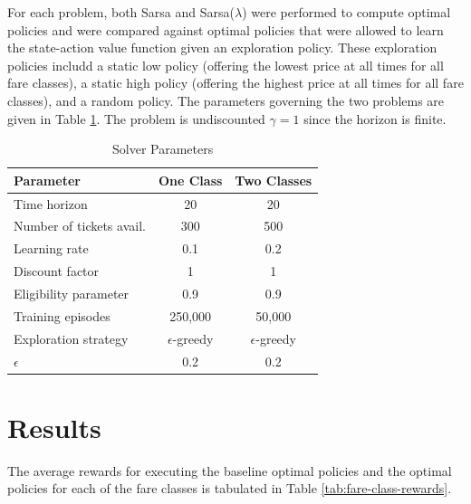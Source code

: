 \documentclass[letterpaper]{article}%
\begin{document}
For each problem, both Sarsa and Sarsa($\lambda$) were performed to compute optimal policies and were compared against optimal policies that were allowed to learn the state-action value function given an exploration policy. These exploration policies includd a static low policy (offering the lowest price at all times for all fare classes), a static high policy (offering the highest price at all times for all fare classes), and a random policy. The parameters governing the two problems are given in Table \ref{tab:fare-class-solver-params}. The problem is undiscounted $\gamma = 1$ since the horizon is finite.

\vspace{40 pt}

\begin{table}[h!]
 \caption{Solver Parameters}
    \vspace{10 pt}
    \label{tab:fare-class-solver-params}
    \centering
    \begin{tabular}{l|cc}
        \hline \hline
        \textbf{Parameter} & \textbf{One Class} &\textbf{Two Classes} \\ \hline
        Time horizon             & 20 & 20 \\
        Number of tickets avail. & 300 & 500 \\
        Learning rate            & 0.1 & 0.2 \\
        Discount factor          & 1 & 1 \\
        Eligibility parameter    & 0.9 & 0.9 \\
        Training episodes        & 250,000 & 50,000 \\
        Exploration strategy     & $\epsilon$-greedy & $\epsilon$-greedy\\
        $\epsilon$               & 0.2 & 0.2 \\
        \hline \hline
    \end{tabular}
\end{table}

\section{Results}

The average rewards for executing the baseline optimal policies and the optimal policies for each of the fare classes is tabulated in Table \ref{tab:fare-class-rewards}.
\end{document}
